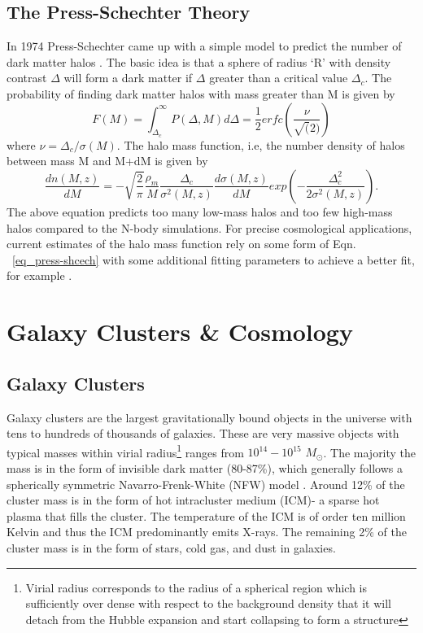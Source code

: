 \subsection{The Press-Schechter Theory}
\label{halo-theory}
In 1974 Press-Schechter came up with a simple model to predict the number of dark matter halos \citep{press74}. The basic idea is that a sphere of radius `R' with density contrast $\Delta$ will form a dark matter if $\Delta$ greater than a critical value $\Delta_{c}$. The probability of finding dark matter halos with mass greater than M is given by
\begin{equation}
F(M) = \int^{\infty}_{\Delta_{c}} P(\Delta, M) d\Delta = \frac{1}{2} erfc(\frac{\nu}{\sqrt(2)})
\end{equation}
where $\nu = \Delta_{c}/ \sigma(M)$. The halo mass function, i.e, the number density of halos between mass M and M+dM is given by 
\begin{equation}
\frac{dn(M,z)}{dM} = -\sqrt{\frac{2}{\pi}} \frac{\rho_{m}}{M} \frac{\Delta_{c}}{\sigma^{2}(M,z)} \frac{d\sigma(M,z)}{dM}  exp(-\frac{\Delta^{2}_{c}}{2 \sigma^{2}(M,z)}).
\label{eq_press-shcech}
\end{equation}
The above equation predicts too many low-mass halos and too few high-mass halos compared to the N-body simulations. 
For precise cosmological applications, current estimates of the halo mass function rely on some form of Eqn. ~\ref{eq_press-shcech} with some additional fitting parameters to achieve a better fit, for example \cite{tinker08, jenkins01}.

\section{Galaxy Clusters \& Cosmology}
\subsection{Galaxy Clusters}
Galaxy clusters are the largest gravitationally bound objects in the universe with tens to hundreds of thousands of galaxies. 
These are very massive objects with typical masses within virial radius\footnote{Virial radius corresponds to the radius of a spherical region which is sufficiently over dense with respect to the background density that it will detach from the Hubble expansion and start collapsing to form a structure} ranges from $10^{14} - 10^{15}$ $M_{\odot}$. 
The majority the mass is in the form of invisible dark matter (80-87\%), which generally follows a spherically symmetric Navarro-Frenk-White (NFW) model  \citep{navarro97}. 
Around 12\% of the cluster mass is in the form of hot intracluster medium (ICM)- a sparse hot plasma that fills the cluster. 
The temperature of the ICM is of order ten million Kelvin and thus the ICM predominantly emits X-rays. 
The remaining 2\% of the cluster mass is in the form of stars, cold gas, and dust in galaxies.

